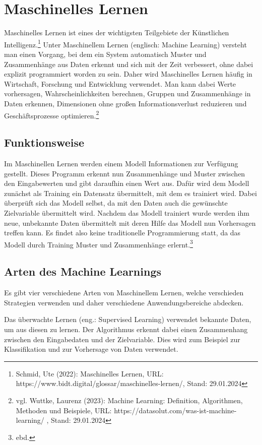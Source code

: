 \documentclass[11pt,oneside]{report}
\begin{document}
\section{Maschinelles Lernen}
Maschinelles Lernen ist eines der wichtigsten Teilgebiete der Künstlichen Intelligenz.\footnote{Schmid, Ute (2022): Maschinelles Lernen, URL: https://www.bidt.digital/glossar/maschinelles-lernen/, Stand: 29.01.2024} Unter Maschinellem Lernen (englisch: Machine Learning) versteht man einen Vorgang, bei dem ein System automatisch Muster und Zusammenhänge aus Daten erkennt und sich mit der Zeit verbessert, ohne dabei explizit programmiert worden zu sein. Daher wird Maschinelles Lernen häufig in Wirtschaft, Forschung und Entwicklung verwendet. Man kann dabei Werte vorhersagen, Wahrscheinlichkeiten berechnen, Gruppen und Zusammenhänge in Daten erkennen, Dimensionen ohne großen Informationsverlust reduzieren und Geschäftsprozesse optimieren.\footnote{vgl. Wuttke, Laurenz (2023): Machine Learning: Definition, Algorithmen, Methoden und Beispiele, URL: https://datasolut.com/was-ist-machine-learning/ , Stand: 29.01.2024}

\subsection{Funktionsweise}
Im Maschinellen Lernen werden einem Modell Informationen zur Verfügung gestellt. Dieses Programm erkennt nun Zusammenhänge und Muster zwischen den Eingabewerten und gibt daraufhin einen Wert aus. Dafür wird dem Modell zunächst als Training ein Datensatz übermittelt, mit dem es trainiert wird. Dabei überprüft sich das Modell selbst, da mit den Daten auch die gewünschte Zielvariable übermittelt wird. Nachdem das Modell trainiert wurde werden ihm neue, unbekannte Daten übermittelt mit deren Hilfe das Modell nun Vorhersagen treffen kann. Es findet also keine traditionelle Programmierung statt, da das Modell durch Training Muster und Zusammenhänge erlernt.\footnote{ebd.}

\subsection{Arten des Machine Learnings}
Es gibt vier verschiedene Arten von Maschinellem Lernen, welche verschieden Strategien verwenden und daher verschiedene Anwendungsbereiche abdecken.

Das überwachte Lernen (eng.: Supervised Learning) verwendet bekannte Daten, um aus diesen zu lernen. Der Algorithmus erkennt dabei einen Zusammenhang zwischen den Eingabedaten und der Zielvariable. Dies wird zum Beispiel zur Klassifikation und zur Vorhersage von Daten verwendet.
\end{document}
